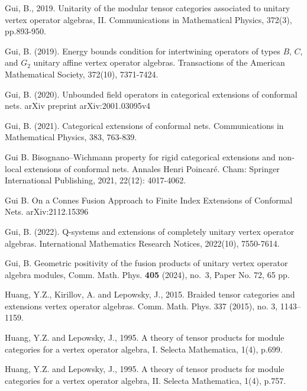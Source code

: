 \documentclass[11pt,b5paper,notitlepage]{article}
\theoremstyle{definition}
\theoremstyle{plain}
\numberwithin{equation}{section}
\begin{document}
\begin{thebibliography}{999999}
Gui, B., 2019. Unitarity of the modular tensor categories associated to unitary vertex operator algebras, II. Communications in Mathematical Physics, 372(3), pp.893-950.


Gui, B. (2019). Energy bounds condition for intertwining operators of types $B$, $C$, and $G_2$ unitary affine vertex operator algebras. Transactions of the American Mathematical Society, 372(10), 7371-7424.



Gui, B. (2020). Unbounded field operators in categorical extensions of conformal nets. arXiv preprint arXiv:2001.03095v4




Gui, B. (2021). Categorical extensions of conformal nets. Communications in Mathematical Physics, 383, 763-839.


Gui B. Bisognano–Wichmann property for rigid categorical extensions and non-local extensions of conformal nets. Annales Henri Poincaré. Cham: Springer International Publishing, 2021, 22(12): 4017-4062.

Gui B. On a Connes Fusion Approach to Finite Index Extensions of Conformal Nets. arXiv:2112.15396 

Gui, B. (2022). Q-systems and extensions of completely unitary vertex operator algebras. International Mathematics Research Notices, 2022(10), 7550-7614.




Gui, B. Geometric positivity of the fusion products of unitary vertex operator algebra modules, Comm. Math. Phys. {\bf 405} (2024), no.~3, Paper No. 72, 65 pp.



Huang, Y.Z., Kirillov, A. and Lepowsky, J., 2015. Braided tensor categories and extensions vertex operator algebras. Comm. Math. Phys. 337 (2015), no. 3, 1143–1159.



Huang, Y.Z. and Lepowsky, J., 1995. A theory of tensor products for module categories
for a vertex operator algebra, I. Selecta Mathematica, 1(4), p.699.

Huang, Y.Z. and Lepowsky, J., 1995. A theory of tensor products for module categories
for a vertex operator algebra, II. Selecta Mathematica, 1(4), p.757.


\end{thebibliography}
\end{document}
